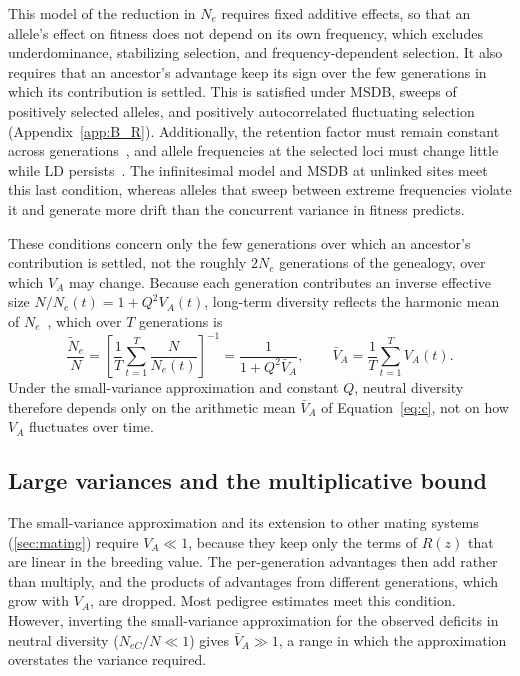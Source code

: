 \documentclass{article}
\begin{document}
This model of the reduction in $N_e$ requires fixed additive effects, so that an allele's effect on fitness does not depend on its own frequency, which excludes underdominance, stabilizing selection, and frequency-dependent selection. It also requires that an ancestor's advantage keep its sign over the few generations in which its contribution is settled. This is satisfied under MSDB, sweeps of positively selected alleles, and positively autocorrelated fluctuating selection (Appendix~\ref{app:B_R}). Additionally, the retention factor must remain constant across generations~\cite{santiago1995}, and allele frequencies at the selected loci must change little while LD persists~\cite{barton2000}. The infinitesimal model and MSDB at unlinked sites meet this last condition, whereas alleles that sweep between extreme frequencies violate it and generate more drift than the concurrent variance in fitness predicts.

These conditions concern only the few generations over which an ancestor's contribution is settled, not the roughly $2N_e$ generations of the genealogy, over which $V_A$ may change. Because each generation contributes an inverse effective size $N/N_e(t) = 1 + Q^2V_A(t)$, long-term diversity reflects the harmonic mean of $N_e$~\cite{wright1938}, which over $T$ generations is
\begin{equation}
    \frac{\tilde{N}_e}{N} = \left[\frac{1}{T}\sum_{t=1}^{T} \frac{N}{N_e(t)}\right]^{-1} = \frac{1}{1 + Q^2\bar{V}_A}, \qquad \bar{V}_A = \frac{1}{T}\sum_{t=1}^{T} V_A(t). \label{eq:harmonic}
\end{equation}
Under the small-variance approximation and constant $Q$, neutral diversity therefore depends only on the arithmetic mean $\bar{V}_A$ of Equation~\eqref{eq:c}, not on how $V_A$ fluctuates over time.

\subsection{Large variances and the multiplicative bound}\label{sec:onemodel}
The small-variance approximation and its extension to other mating systems (\autoref{sec:mating}) require $V_A \ll 1$, because they keep only the terms of $R(z)$ that are linear in the breeding value. The per-generation advantages then add rather than multiply, and the products of advantages from different generations, which grow with $V_A$, are dropped. Most pedigree estimates meet this condition. However, inverting the small-variance approximation for the observed deficits in neutral diversity ($N_{eC}/N \ll 1$) gives $\bar{V}_A \gg 1$, a range in which the approximation overstates the variance required.
\end{document}
